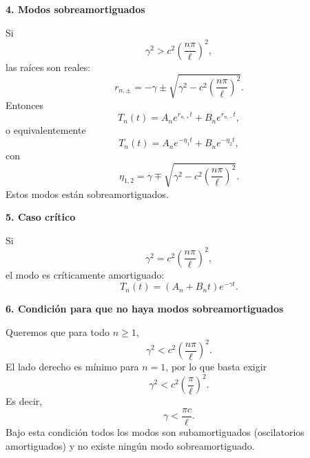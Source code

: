 \documentclass[11pt,spanish]{article}
\begin{document}
{\bf 4. Modos sobreamortiguados}

Si
$$
\gamma^2
>
c^2\left(\frac{n\pi}{\ell}\right)^2,
$$
las raíces son reales:
$$
r_{n,\pm}
=
-\gamma
\pm
\sqrt{
\gamma^2
-c^2\left(\frac{n\pi}{\ell}\right)^2
}.
$$
Entonces
$$
T_n(t)
=
A_n e^{r_{n,+}t}
+
B_n e^{r_{n,-}t},
$$
o equivalentemente
$$
T_n(t)
=
A_n e^{-\eta_1 t}
+
B_n e^{-\eta_2 t},
$$
con
$$
\eta_{1,2}
=
\gamma
\mp
\sqrt{
\gamma^2
-c^2\left(\frac{n\pi}{\ell}\right)^2
}.
$$
Estos modos están sobreamortiguados.

{\bf 5. Caso crítico}

Si
$$
\gamma^2
=
c^2\left(\frac{n\pi}{\ell}\right)^2,
$$
el modo es críticamente amortiguado:
$$
T_n(t)
=
(A_n+B_n t)e^{-\gamma t}.
$$

{\bf 6. Condición para que no haya modos sobreamortiguados}

Queremos que para todo $n\ge 1$,
$$
\gamma^2
<
c^2\left(\frac{n\pi}{\ell}\right)^2.
$$
El lado derecho es mínimo para $n=1$, por lo que basta exigir
$$
\gamma^2
<
c^2\left(\frac{\pi}{\ell}\right)^2.
$$
Es decir,
$$
\boxed{
\gamma < \frac{\pi c}{\ell}.
}
$$
Bajo esta condición todos los modos son subamortiguados (oscilatorios amortiguados) y no existe ningún modo sobreamortiguado.

 
%
%
\end{document}
